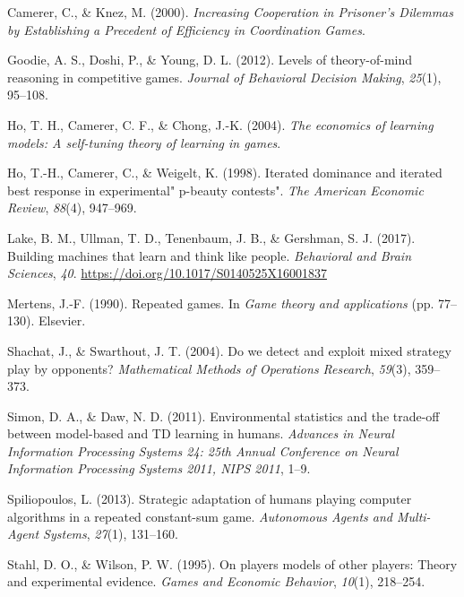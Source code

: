 \documentclass[man,floatsintext]{apa6}
\begin{document}
\leavevmode\hypertarget{ref-knez2000}{}%
Camerer, C., \& Knez, M. (2000). \emph{Increasing Cooperation in Prisoner's Dilemmas by Establishing a Precedent of Efficiency in Coordination Games}.

\leavevmode\hypertarget{ref-goodie2012levels}{}%
Goodie, A. S., Doshi, P., \& Young, D. L. (2012). Levels of theory-of-mind reasoning in competitive games. \emph{Journal of Behavioral Decision Making}, \emph{25}(1), 95--108.

\leavevmode\hypertarget{ref-ho2004economics}{}%
Ho, T. H., Camerer, C. F., \& Chong, J.-K. (2004). \emph{The economics of learning models: A self-tuning theory of learning in games}.

\leavevmode\hypertarget{ref-ho1998iterated}{}%
Ho, T.-H., Camerer, C., \& Weigelt, K. (1998). Iterated dominance and iterated best response in experimental" p-beauty contests". \emph{The American Economic Review}, \emph{88}(4), 947--969.

\leavevmode\hypertarget{ref-Lake2017}{}%
Lake, B. M., Ullman, T. D., Tenenbaum, J. B., \& Gershman, S. J. (2017). Building machines that learn and think like people. \emph{Behavioral and Brain Sciences}, \emph{40}. \url{https://doi.org/10.1017/S0140525X16001837}

\leavevmode\hypertarget{ref-mertens1990repeated}{}%
Mertens, J.-F. (1990). Repeated games. In \emph{Game theory and applications} (pp. 77--130). Elsevier.

\leavevmode\hypertarget{ref-shachat2004we}{}%
Shachat, J., \& Swarthout, J. T. (2004). Do we detect and exploit mixed strategy play by opponents? \emph{Mathematical Methods of Operations Research}, \emph{59}(3), 359--373.

\leavevmode\hypertarget{ref-Simon_Daw_11}{}%
Simon, D. A., \& Daw, N. D. (2011). Environmental statistics and the trade-off between model-based and TD learning in humans. \emph{Advances in Neural Information Processing Systems 24: 25th Annual Conference on Neural Information Processing Systems 2011, NIPS 2011}, 1--9.

\leavevmode\hypertarget{ref-spiliopoulos2013strategic}{}%
Spiliopoulos, L. (2013). Strategic adaptation of humans playing computer algorithms in a repeated constant-sum game. \emph{Autonomous Agents and Multi-Agent Systems}, \emph{27}(1), 131--160.

\leavevmode\hypertarget{ref-stahl1995players}{}%
Stahl, D. O., \& Wilson, P. W. (1995). On players models of other players: Theory and experimental evidence. \emph{Games and Economic Behavior}, \emph{10}(1), 218--254.
\end{document}
